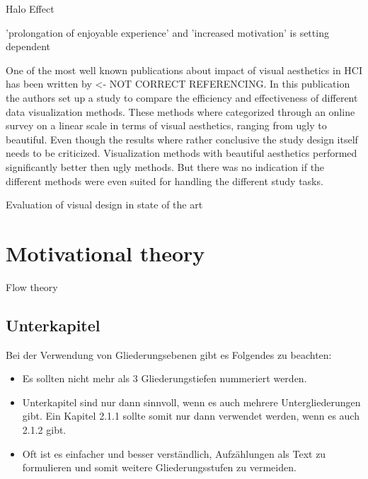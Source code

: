 Halo Effect

'prolongation of enjoyable experience' and 'increased motivation' is setting dependent \cite{sonderegger2010influence}

One of the most well known publications about impact of visual aesthetics in \gls{HCI} has been written by  <- NOT CORRECT REFERENCING.
In this publication the authors set up a study to compare the efficiency and effectiveness of different data visualization methods.
These methods where categorized through an online survey on a linear scale in terms of visual aesthetics, ranging from ugly to beautiful.
Even though the results where rather conclusive the study design itself needs to be criticized.
Visualization methods with beautiful aesthetics performed significantly better then ugly methods. 
But there was no indication if the different methods were even suited for handling the different study tasks.

Evaluation of visual design in state of the art

\section{Motivational theory}

Flow theory

\subsection{Unterkapitel}

Bei der Verwendung von Gliederungsebenen gibt es Folgendes zu beachten:
\begin{itemize}
	\item Es sollten nicht mehr als 3 Gliederungstiefen nummeriert werden.
	\item Unterkapitel sind nur dann sinnvoll, wenn es auch mehrere Untergliederungen gibt. Ein Kapitel 2.1.1 sollte somit nur dann verwendet werden, wenn es auch 2.1.2 gibt.
	\item Oft ist es einfacher und besser verständlich, Aufzählungen als Text zu formulieren und somit weitere Gliederungsstufen zu vermeiden.
\end{itemize}

